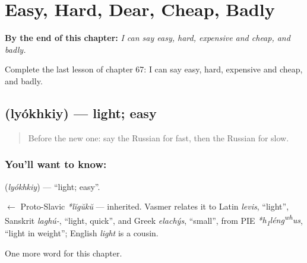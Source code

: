 
\chapter{Easy, Hard, Dear, Cheap, Badly}
\label{ch:ru-easy-hard-dear-cheap-badly}

\begin{chapteropening}
\textbf{By the end of this chapter:} \emph{I can say easy, hard, expensive and cheap, and badly.}

Complete the last lesson of chapter 67: I can say easy, hard, expensive and cheap, and badly.
\end{chapteropening}

\section[\texorpdfstring{\ru{лёгкий} (lyókhkiy)}{лёгкий (lyókhkiy)}]{ (lyókhkiy) — light; easy}

\label{lesson:RU-C67-easy}



\begin{quote}
Before the new one: say the Russian for fast, then the Russian for slow.
\end{quote}

\subsection*{You'll want to know: }
\textbf{} (\emph{lyókhkiy}) — \textquotedblleft{}light; easy\textquotedblright{}.

\begin{cousinweb}
\textbf{} $\leftarrow$ Proto-Slavic \emph{*lĭgŭkŭ} — inherited. Vasmer relates it to Latin \emph{levis}, \textquotedblleft{}light\textquotedblright{}, Sanskrit \emph{laghú-}, \textquotedblleft{}light, quick\textquotedblright{}, and Greek \emph{elachýs}, \textquotedblleft{}small\textquotedblright{}, from PIE \emph{*h\textsubscript{1}léng\textsuperscript{w}\textsuperscript{h}us}, \textquotedblleft{}light in weight\textquotedblright{}; English \emph{light} is a cousin.
\end{cousinweb}

\begin{grammarlens}[title={What you've built}]
One more word for this chapter.
\end{grammarlens}

